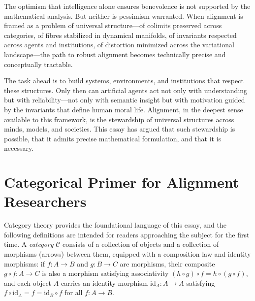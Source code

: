 \documentclass[12pt]{article}
\theoremstyle{definition}
\begin{document}
The optimism that intelligence alone ensures benevolence is not supported by the
mathematical analysis. But neither is pessimism warranted. When alignment is
framed as a problem of universal structure---of colimits preserved across
categories, of fibres stabilized in dynamical manifolds, of invariants respected
across agents and institutions, of distortion minimized across the variational
landscape---the path to robust alignment becomes technically precise and
conceptually tractable.

The task ahead is to build systems, environments, and institutions that respect
these structures. Only then can artificial agents act not only with
understanding but with reliability---not only with semantic insight but with
motivation guided by the invariants that define human moral life. Alignment, in
the deepest sense available to this framework, is the stewardship of universal
structures across minds, models, and societies. This essay has argued that such
stewardship is possible, that it admits precise mathematical formulation, and
that it is necessary.

\newpage
\appendix

\section{Categorical Primer for Alignment Researchers}
\label{app:primer}

Category theory provides the foundational language of this essay, and the
following definitions are intended for readers approaching the subject for the
first time. A \emph{category} $\mathcal{C}$ consists of a collection of objects
and a collection of morphisms (arrows) between them, equipped with a composition
law and identity morphisms: if $f : A \to B$ and $g : B \to C$ are morphisms,
their composite $g \circ f : A \to C$ is also a morphism satisfying associativity
$(h \circ g) \circ f = h \circ (g \circ f)$, and each object $A$ carries an
identity morphism $\mathrm{id}_A : A \to A$ satisfying $f \circ \mathrm{id}_A
= f = \mathrm{id}_B \circ f$ for all $f : A \to B$.
\end{document}
